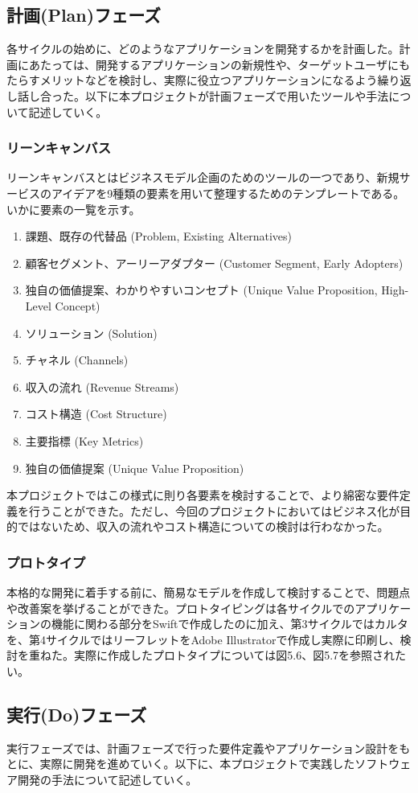 \subsection{計画(Plan)フェーズ}
各サイクルの始めに、どのようなアプリケーションを開発するかを計画した。計画にあたっては、開発するアプリケーションの新規性や、ターゲットユーザにもたらすメリットなどを検討し、実際に役立つアプリケーションになるよう繰り返し話し合った。以下に本プロジェクトが計画フェーズで用いたツールや手法について記述していく。
\subsubsection{リーンキャンバス}
リーンキャンバスとはビジネスモデル企画のためのツールの一つであり、新規サービスのアイデアを9種類の要素を用いて整理するためのテンプレートである。いかに要素の一覧を示す。
\begin{enumerate}
\item 課題、既存の代替品 (Problem, Existing Alternatives)
\item 顧客セグメント、アーリーアダプター (Customer Segment, Early Adopters)
\item 独自の価値提案、わかりやすいコンセプト (Unique Value Proposition, High-Level Concept)
\item ソリューション (Solution)
\item チャネル (Channels)
\item 収入の流れ (Revenue Streams)
\item コスト構造 (Cost Structure)
\item 主要指標 (Key Metrics)
\item 独自の価値提案 (Unique Value Proposition)
\end{enumerate}
本プロジェクトではこの様式に則り各要素を検討することで、より綿密な要件定義を行うことができた。ただし、今回のプロジェクトにおいてはビジネス化が目的ではないため、収入の流れやコスト構造についての検討は行わなかった。
\subsubsection{プロトタイプ}
本格的な開発に着手する前に、簡易なモデルを作成して検討することで、問題点や改善案を挙げることができた。プロトタイピングは各サイクルでのアプリケーションの機能に関わる部分をSwiftで作成したのに加え、第3サイクルではカルタを、第4サイクルではリーフレットをAdobe Illustratorで作成し実際に印刷し、検討を重ねた。実際に作成したプロトタイプについては図5.6、図5.7を参照されたい。
\subsection{実行(Do)フェーズ}
実行フェーズでは、計画フェーズで行った要件定義やアプリケーション設計をもとに、実際に開発を進めていく。以下に、本プロジェクトで実践したソフトウェア開発の手法について記述していく。
